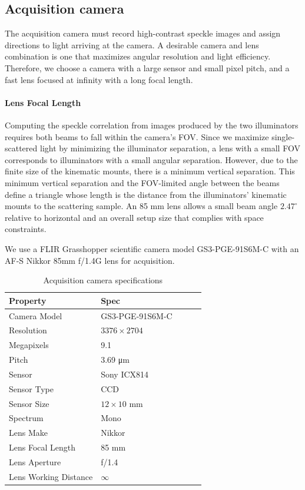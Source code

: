 \subsection{Acquisition camera}
The acquisition camera must record high-contrast speckle images and assign directions to light arriving at the camera. A desirable camera and lens combination is one that maximizes angular resolution and light efficiency. Therefore, we choose a camera with a large sensor and small pixel pitch, and a fast lens focused at infinity with a long focal length.

\paragraph{Lens Focal Length} Computing the speckle correlation from images produced by the two illuminators requires both beams to fall within the camera's FOV. Since we maximize single-scattered light by minimizing the illuminator separation, a lens with a small FOV corresponds to illuminators with a small angular separation. However, due to the finite size of the kinematic mounts, there is a minimum vertical separation. This minimum vertical separation and the FOV-limited angle between the beams define a triangle whose length is the distance from the illuminators' kinematic mounts to the scattering sample. An 85 mm lens allows a small beam angle $2.47^\circ$ relative to horizontal and an overall setup size that complies with space constraints.

We use a FLIR Grasshopper scientific camera model GS3-PGE-91S6M-C with an AF-S Nikkor 85mm f/1.4G lens for acquisition.

\begin{table}[htbp]
    \renewcommand{\arraystretch}{1.25}
    \caption{Acquisition camera specifications}
    \begin{center}
        \begin{tabular}{ l l l l l }
        \toprule[2pt]
         \textbf{Property} & \textbf{Spec} \\
         \midrule[0.75pt]
         Camera Model & GS3-PGE-91S6M-C \\
         Resolution & $3376 \times 2704$ \\
         Megapixels & 9.1 \\
         Pitch & 3.69 \si{\micro m} \\
         Sensor & Sony ICX814 \\
         Sensor Type & CCD \\
         Sensor Size & $12 \times 10$ mm \\
         Spectrum & Mono \\
         Lens Make & Nikkor \\
         Lens Focal Length & 85 \si{mm} \\
         Lens Aperture & f/1.4 \\
         Lens Working Distance & $\infty$ \\
         \bottomrule[2pt]
        \end{tabular}
        \label{tab:cpu-gpu}
    \end{center}
\end{table}

